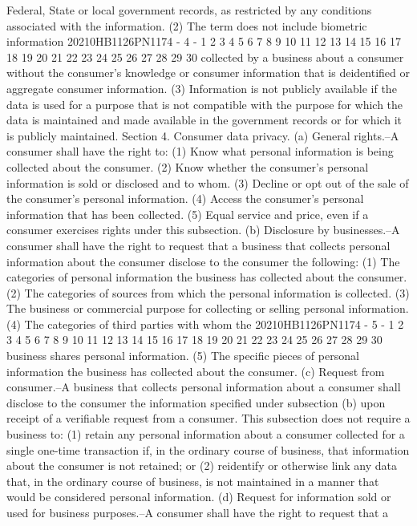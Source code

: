 Federal, State or local government records, as restricted by
any conditions associated with the information.
(2) The term does not include biometric information
20210HB1126PN1174 - 4 -
1
2
3
4
5
6
7
8
9
10
11
12
13
14
15
16
17
18
19
20
21
22
23
24
25
26
27
28
29
30
collected by a business about a consumer without the
consumer's knowledge or consumer information that is
deidentified or aggregate consumer information.
(3) Information is not publicly available if the data is
used for a purpose that is not compatible with the purpose
for which the data is maintained and made available in the
government records or for which it is publicly maintained.
Section 4. Consumer data privacy.
(a) General rights.--A consumer shall have the right to:
(1) Know what personal information is being collected
about the consumer.
(2) Know whether the consumer's personal information is
sold or disclosed and to whom.
(3) Decline or opt out of the sale of the consumer's
personal information.
(4) Access the consumer's personal information that has
been collected.
(5) Equal service and price, even if a consumer
exercises rights under this subsection.
(b) Disclosure by businesses.--A consumer shall have the
right to request that a business that collects personal
information about the consumer disclose to the consumer the
following:
(1) The categories of personal information the business
has collected about the consumer.
(2) The categories of sources from which the personal
information is collected.
(3) The business or commercial purpose for collecting or
selling personal information.
(4) The categories of third parties with whom the
20210HB1126PN1174 - 5 -
1
2
3
4
5
6
7
8
9
10
11
12
13
14
15
16
17
18
19
20
21
22
23
24
25
26
27
28
29
30
business shares personal information.
(5) The specific pieces of personal information the
business has collected about the consumer.
(c) Request from consumer.--A business that collects
personal information about a consumer shall disclose to the
consumer the information specified under subsection (b) upon
receipt of a verifiable request from a consumer. This subsection
does not require a business to:
(1) retain any personal information about a consumer
collected for a single one-time transaction if, in the
ordinary course of business, that information about the
consumer is not retained; or
(2) reidentify or otherwise link any data that, in the
ordinary course of business, is not maintained in a manner
that would be considered personal information.
(d) Request for information sold or used for business
purposes.--A consumer shall have the right to request that a
